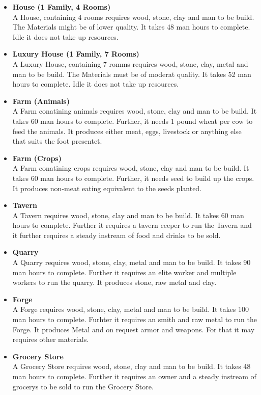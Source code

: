 \documentclass[10pt,twoside,twocolumn,openany]{book}
\begin{document}
\begin{itemize}
\item \textbf{House (1 Family, 4 Rooms)} \\ A House, containing 4 rooms requires wood, stone, clay and man to be build. The Materials might be of lower quality. It takes 48 man hours to complete. Idle it does not take up resources.
\item \textbf{Luxury House (1 Family, 7 Rooms)} \\ A Luxury House, containing 7 romms requires wood, stone, clay, metal and man to be build. The Materials must be of moderat quality. It takes 52 man hours to complete. Idle it does not take up resources.
\item \textbf{Farm (Animals)} \\ A Farm conatining animals requires wood, stone, clay and man to be build. It takes 60 man hours to complete. Further, it needs 1 pound wheat per cow to feed the animals. It produces either meat, eggs, livestock or anything else that suits the foot presentet.
\item \textbf{Farm (Crops)} \\ A Farm conatining crops requires wood, stone, clay and man to be build. It takes 60 man hours to complete. Further, it needs seed to build up the crops. It produces non-meat eating equivalent to the seeds planted.
\item \textbf{Tavern} \\ A Tavern requires wood, stone, clay and man to be build. It takes 60 man hours to complete. Further it requires a tavern ceeper to run the Tavern and it further requires a steady instream of food and drinks to be sold.
\item \textbf{Quarry} \\ A Quarry requires wood, stone, clay, metal and man to be build. It takes 90 man hours to complete. Further it requires an elite worker and multiple workers to run the quarry. It produces stone, raw metal and clay.
\item \textbf{Forge} \\ A Forge requires wood, stone, clay, metal and man to be build. It takes 100 man hours to complete. Furhter it requires an smith and raw metal to run the Forge. It produces Metal and on request armor and weapons. For that it may requires other materials.
\item \textbf{Grocery Store} \\ A Grocery Store requires wood, stone, clay and man to be build. It takes 48 man hours to complete. Further it requires an owner and a steady instream of grocerys to be sold to run the Grocery Store.

\end{itemize}
\end{document}
